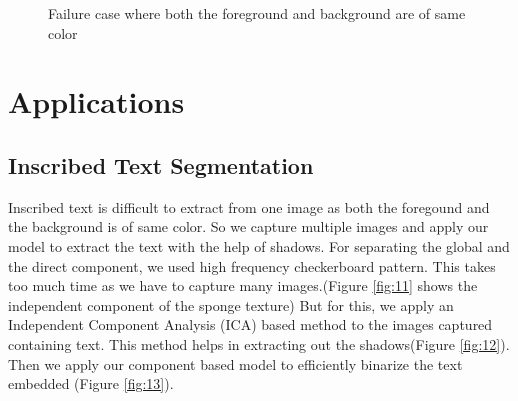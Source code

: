 


\begin{figure}[t]
\centering
{}
\caption
{Failure case where both the foreground and background are of same color}
\label{fig:8}
\end{figure}

\section{Applications}

\subsection{Inscribed Text Segmentation}


Inscribed text is difficult to extract from one image as both the foregound and the background is of same 
color.
So we capture multiple images and apply our model to extract the text with the help of shadows.
For separating the global and the direct component, we used high frequency checkerboard pattern. 
This takes too much time as we have to capture many images.(Figure \ref{fig:11} shows
the independent component of the sponge texture)
But for this, we apply an Independent Component Analysis (ICA) based method to the images captured containing text.
This method helps in extracting out the shadows(Figure \ref{fig:12}). 
Then we apply our component based model to efficiently binarize the text
embedded (Figure \ref{fig:13}).


